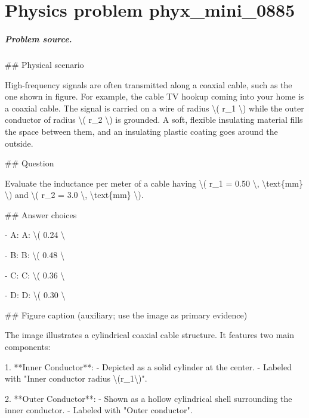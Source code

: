 
\chapter{Physics problem phyx\_mini\_0885}
\label{ch:PhyXMiniProblems_problem_phyx_mini_0885}

\paragraph{Problem source.}
\#\# Physical scenario

High-frequency signals are often transmitted along a coaxial cable, such as the one shown in figure. For example, the cable TV hookup coming into your home is a coaxial cable. The signal is carried on a wire of radius \textbackslash{}( r\_1 \textbackslash{}) while the outer conductor of radius \textbackslash{}( r\_2 \textbackslash{}) is grounded. A soft, flexible insulating material fills the space between them, and an insulating plastic coating goes around the outside.

\#\# Question

Evaluate the inductance per meter of a cable having \textbackslash{}( r\_1 = 0.50 \textbackslash{}, \textbackslash{}text\{mm\} \textbackslash{}) and \textbackslash{}( r\_2 = 3.0 \textbackslash{}, \textbackslash{}text\{mm\} \textbackslash{}).

\#\# Answer choices

- A: A: \textbackslash{}( 0.24 \textbackslash{}

- B: B: \textbackslash{}( 0.48 \textbackslash{}

- C: C: \textbackslash{}( 0.36 \textbackslash{}

- D: D: \textbackslash{}( 0.30 \textbackslash{}

\#\# Figure caption (auxiliary; use the image as primary evidence)

The image illustrates a cylindrical coaxial cable structure. It features two main components:

1. **Inner Conductor**: 
   - Depicted as a solid cylinder at the center.
   - Labeled with "Inner conductor radius \textbackslash{}(r\_1\textbackslash{})".

2. **Outer Conductor**:
   - Shown as a hollow cylindrical shell surrounding the inner conductor.
   - Labeled with "Outer conductor".

